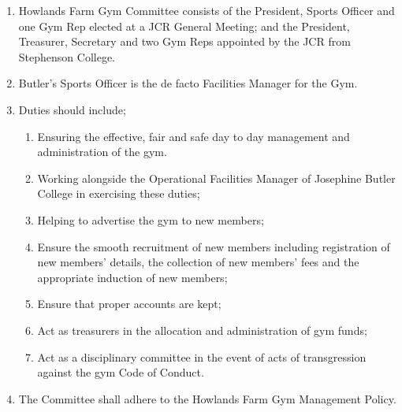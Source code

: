 \begin{enumerate}
    \item Howlands Farm Gym Committee consists of the President, Sports Officer and one Gym Rep elected at a JCR General Meeting; and the President, Treasurer, Secretary and two Gym Reps appointed by the JCR from Stephenson College.
    \item Butler’s Sports Officer is the de facto Facilities Manager for the Gym.
    \item Duties should include;
    \begin{enumerate}
        \item Ensuring the effective, fair and safe day to day management and administration of the gym.
        \item Working alongside the Operational Facilities Manager of Josephine Butler College in exercising these duties;
        \item Helping to advertise the gym to new members;
        \item Ensure the smooth recruitment of new members including registration of new members’ details, the collection of new members’ fees and the appropriate induction of new members;
        \item Ensure that proper accounts are kept;
        \item Act as treasurers in the allocation and administration of gym funds;
        \item Act as a disciplinary committee in the event of acts of transgression against the gym Code of Conduct.
    \end{enumerate}
    \item The Committee shall adhere to the Howlands Farm Gym Management Policy.
\end{enumerate}


